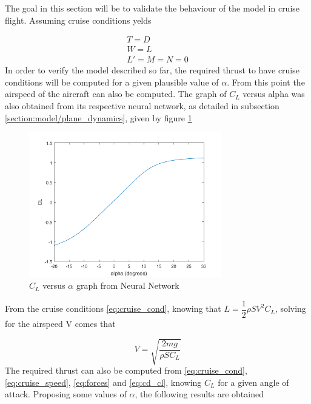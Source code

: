 The goal in this section will be to validate the behaviour of the model in cruise flight. Assuming cruise conditions yelds

\begin{gather}
	T=D\\
	W=L\\
	L'=M=N=0
\label{eq:cruise_cond}
\end{gather}
In order to verify the model described so far, the required thrust to have cruise conditions will be computed for a given plausible value of $\alpha$. From this point the airspeed of the aircraft can also be computed. The graph of $C_L$ versus alpha was also obtained from its respective neural network, as detailed in subsection \ref{section:model/plane_dynamics}, given by figure \ref{fig:cl_alpha}
\begin{figure}[!htb]
  \centering
  \includegraphics[width=0.75\textwidth]{Figures/CL_alpha.png}
  \caption[$C_L$ versus $\alpha$ graph]{$C_L$ versus $\alpha$ graph from Neural Network}
  \label{fig:cl_alpha}
\end{figure}
From the cruise conditions \ref{eq:cruise_cond}, knowing that $L=\dfrac{1}{2}\rho S V^2 C_L$, solving for the airspeed V comes that

\begin{equation}
V=\sqrt{\dfrac{2mg}{\rho S C_L}}
\label{eq:cruise_speed}
\end{equation}
The required thrust can also be computed from \ref{eq:cruise_cond}, \ref{eq:cruise_speed}, \ref{eq:forces} and \ref{eq:cd_cl}, knowing $C_L$ for a given angle of attack. Proposing some values of $\alpha$, the following results are obtained

